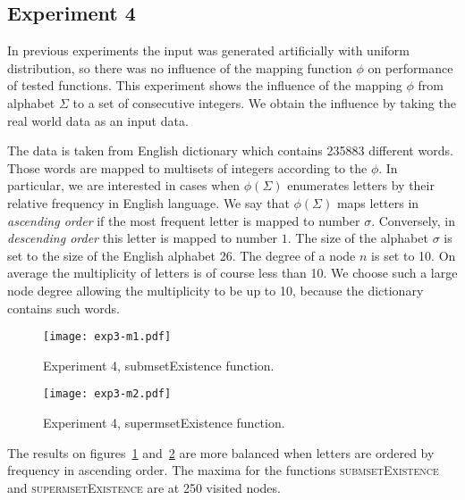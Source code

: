 \subsection{Experiment 4} \label{s:exp4}
In previous experiments the input was generated artificially with uniform 
distribution, so there was no influence of the mapping function $\phi$ on 
performance of tested functions. This experiment shows the influence of the 
mapping $\phi$ from alphabet $\Sigma$ to a set of consecutive integers. 
We obtain the influence by taking the real world data as an input data. 

The data is taken from English dictionary which contains 235883 different words. 
Those words are mapped to multisets of integers according to the $\phi.$ In 
particular, we are interested in cases when $\phi(\Sigma)$ enumerates 
letters by their relative frequency in English language. We say that $\phi(\Sigma)$ 
maps letters in \emph{ascending order} if the most frequent letter is mapped to 
number $\sigma.$ Conversely, in \emph{descending order} this letter is mapped to 
number $1.$ The size of the alphabet $\sigma$ is set to the size of the English 
alphabet 26. The degree of a node $n$ is set to 10. On average the multiplicity 
of letters is of course less than 10. We choose such a large node degree allowing 
the multiplicity to be up to 10, because the dictionary contains such words. 


\begin{figure}
\center
\texttt{[image: exp3-m1.pdf]}
\caption{Experiment 4, submsetExistence function.}
\label{fig:e4m1}
\end{figure}

\begin{figure}
\center
\texttt{[image: exp3-m2.pdf]}
\caption{Experiment 4, supermsetExistence function.}
\label{fig:e4m2}
\end{figure}

%

The results on figures~\ref{fig:e4m1} and~\ref{fig:e4m2} are more balanced when 
letters are ordered by frequency in ascending order. The maxima for the functions 
\textsc{submsetExistence} and \textsc{supermsetExistence} are at 250 visited nodes. 

